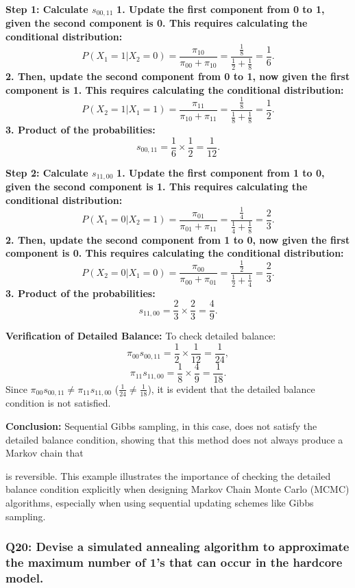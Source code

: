 \documentclass[8pt]{article}
\begin{document}
\textbf{Step 1: Calculate \(s_{00, 11}\)}
\textbf{1. Update the first component from 0 to 1, given the second component is 0. This requires calculating the conditional distribution:}
   \[
   P(X_1 = 1 | X_2 = 0) = \frac{\pi_{10}}{\pi_{00} + \pi_{10}} = \frac{\frac{1}{8}}{\frac{1}{2} + \frac{1}{8}} = \frac{1}{6}.
   \]
\textbf{2. Then, update the second component from 0 to 1, now given the first component is 1. This requires calculating the conditional distribution:}
   \[
   P(X_2 = 1 | X_1 = 1) = \frac{\pi_{11}}{\pi_{10} + \pi_{11}} = \frac{\frac{1}{8}}{\frac{1}{8} + \frac{1}{8}} = \frac{1}{2}.
   \]
\textbf{3. Product of the probabilities:}
   \[
   s_{00, 11} = \frac{1}{6} \times \frac{1}{2} = \frac{1}{12}.
   \]

\textbf{Step 2: Calculate \(s_{11, 00}\)}
\textbf{1. Update the first component from 1 to 0, given the second component is 1. This requires calculating the conditional distribution:}
   \[
   P(X_1 = 0 | X_2 = 1) = \frac{\pi_{01}}{\pi_{01} + \pi_{11}} = \frac{\frac{1}{4}}{\frac{1}{4} + \frac{1}{8}} = \frac{2}{3}.
   \]
\textbf{2. Then, update the second component from 1 to 0, now given the first component is 0. This requires calculating the conditional distribution:}
   \[
   P(X_2 = 0 | X_1 = 0) = \frac{\pi_{00}}{\pi_{00} + \pi_{01}} = \frac{\frac{1}{2}}{\frac{1}{2} + \frac{1}{4}} = \frac{2}{3}.
   \]
\textbf{3. Product of the probabilities:}
   \[
   s_{11, 00} = \frac{2}{3} \times \frac{2}{3} = \frac{4}{9}.
   \]

\textbf{Verification of Detailed Balance:}
To check detailed balance:
\[
\pi_{00} s_{00, 11} = \frac{1}{2} \times \frac{1}{12} = \frac{1}{24},
\]
\[
\pi_{11} s_{11, 00} = \frac{1}{8} \times \frac{4}{9} = \frac{1}{18}.
\]
Since \(\pi_{00} s_{00, 11} \neq \pi_{11} s_{11, 00}\) (\(\frac{1}{24} \neq \frac{1}{18}\)), it is evident that the detailed balance condition is not satisfied.

\textbf{Conclusion:}
Sequential Gibbs sampling, in this case, does not satisfy the detailed balance condition, showing that this method does not always produce a Markov chain that

 is reversible. This example illustrates the importance of checking the detailed balance condition explicitly when designing Markov Chain Monte Carlo (MCMC) algorithms, especially when using sequential updating schemes like Gibbs sampling.

\subsubsection*{Q20:
Devise a simulated annealing algorithm to approximate the maximum number of 1’s that can occur in the hardcore model.}
\end{document}
